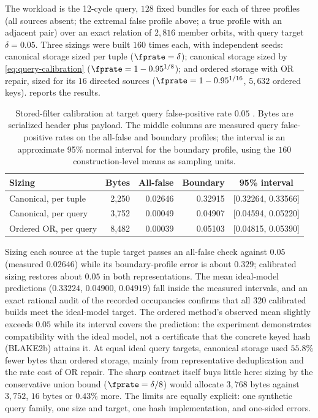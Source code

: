 The workload is the 12-cycle query, $128$ fixed bundles for each of three profiles
(all sources absent; the extremal false profile above; a true profile with an
adjacent pair) over an exact relation of $2{,}816$ member orbits, with query target
$\delta = 0.05$. Three sizings were built $160$ times each, with independent seeds:
canonical storage sized per tuple ($\fprate = \delta$); canonical storage sized by
\eqref{eq:query-calibration} ($\fprate = 1 - 0.95^{1/8}$); and ordered storage with
OR repair, sized for its $16$ directed sources ($\fprate = 1 - 0.95^{1/16}$,
$5{,}632$ ordered keys).  reports the results.

\begin{table}[ht]
\centering
\small
\caption{Stored-filter calibration at target query false-positive rate $0.05$
\parencite[Sec.~7]{towell-bernoulli-relations}. Bytes are serialized header plus
payload. The middle columns are measured query false-positive rates on the
all-false and boundary profiles; the interval is an approximate 95\% normal
interval for the boundary profile, using the $160$ construction-level means as
sampling units.}
\label{tab:filter-calibration}
\setlength{\tabcolsep}{5pt}
\begin{tabular}{lrrrc}
\hline
Sizing & Bytes & All-false & Boundary & 95\% interval \\
\hline
Canonical, per tuple & 2{,}250 & 0.02646 & 0.32915 & [0.32264, 0.33566] \\
Canonical, per query & 3{,}752 & 0.00049 & 0.04907 & [0.04594, 0.05220] \\
Ordered OR, per query & 8{,}482 & 0.00039 & 0.05103 & [0.04815, 0.05390] \\
\hline
\end{tabular}
\end{table}

Sizing each source at the tuple target passes an all-false check
against $0.05$ (measured $0.02646$) while its boundary-profile error is about
$0.329$; calibrated sizing restores about $0.05$ in both representations. The mean
ideal-model predictions ($0.33224$, $0.04900$, $0.04919$) fall inside the measured
intervals, and an exact rational audit of the recorded occupancies confirms that all
$320$ calibrated builds meet the ideal-model target. The ordered method's observed
mean slightly exceeds $0.05$ while its interval covers the prediction: the
experiment demonstrates compatibility with the ideal model, not a certificate that
the concrete keyed hash (BLAKE2b) attains it. At equal ideal query targets,
canonical storage used $55.8\%$ fewer bytes than ordered storage, mainly from
representative deduplication and the rate cost of OR repair. The sharp contract
itself buys little here: sizing by the conservative union bound ($\fprate = \delta /
8$) would allocate $3{,}768$ bytes against $3{,}752$, $16$ bytes or $0.43\%$ more. The
limits are equally explicit: one synthetic query family, one size and target, one
hash implementation, and one-sided errors.

